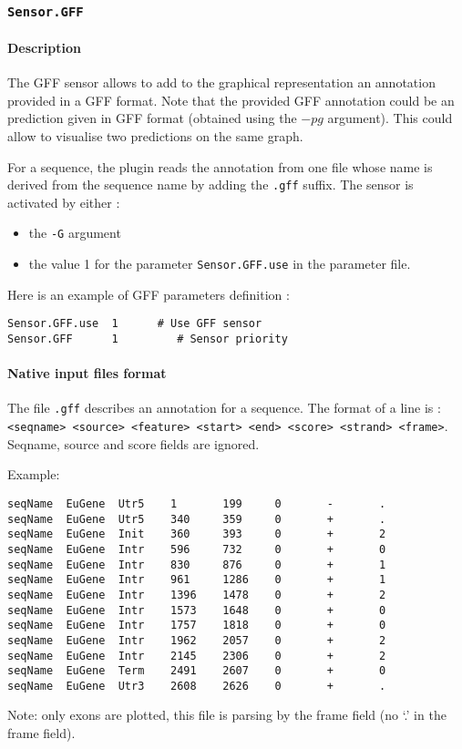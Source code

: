 
\subsubsection{\texttt{Sensor.GFF}}

\paragraph{Description}

The GFF sensor allows to add to the graphical representation an
annotation provided in a GFF format. Note that the provided GFF
annotation could be an \EuGene prediction given in GFF format
(obtained using the $-pg$ argument). This could allow to visualise two
predictions on the same graph.

For a sequence, the plugin reads the annotation from one file whose
name is derived from the sequence name by adding the \texttt{.gff}
suffix.  The sensor is activated by either :
\begin{itemize}
\item the \texttt{-G} argument 
\item the value 1 for the parameter \texttt{Sensor.GFF.use} in the
  parameter file.
\end{itemize}
Here is an example of GFF parameters definition :
\begin{Verbatim}[fontsize=\small]
Sensor.GFF.use  1      # Use GFF sensor
Sensor.GFF      1         # Sensor priority
\end{Verbatim}

\paragraph{Native input files format}

The file \texttt{.gff} describes an annotation for a sequence. The format of
a line is : \texttt{<seqname> <source> <feature> <start> <end> <score>
  <strand> <frame>}. Seqname, source and score fields are ignored.

Example:
\begin{Verbatim}[fontsize=\small]
seqName  EuGene  Utr5    1       199     0       -       .
seqName  EuGene  Utr5    340     359     0       +       .
seqName  EuGene  Init    360     393     0       +       2
seqName  EuGene  Intr    596     732     0       +       0
seqName  EuGene  Intr    830     876     0       +       1
seqName  EuGene  Intr    961     1286    0       +       1
seqName  EuGene  Intr    1396    1478    0       +       2
seqName  EuGene  Intr    1573    1648    0       +       0
seqName  EuGene  Intr    1757    1818    0       +       0
seqName  EuGene  Intr    1962    2057    0       +       2
seqName  EuGene  Intr    2145    2306    0       +       2
seqName  EuGene  Term    2491    2607    0       +       0
seqName  EuGene  Utr3    2608    2626    0       +       .
\end{Verbatim}
Note: only exons are plotted, this file is parsing by the frame field
(no `.' in the frame field).

